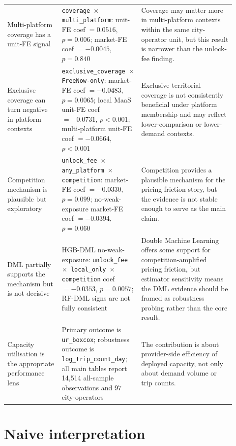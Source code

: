 \documentclass[11pt]{article}
\newcommand{\code}[1]{\texttt{\small #1}}
\begin{document}
\begin{landscape}
\begin{longtable}{L{0.22\linewidth} L{0.32\linewidth} L{0.38\linewidth}}
Multi-platform coverage has a unit-FE signal &
\code{coverage $\times$ multi\_platform}: unit-FE coef $=0.0516$, $p=0.006$; market-FE coef $=-0.0045$, $p=0.840$ &
Coverage may matter more in multi-platform contexts within the same city-operator unit, but this result is narrower than the unlock-fee finding. \\

Exclusive coverage can turn negative in platform contexts &
\code{exclusive\_coverage $\times$ FreeNow-only}: market-FE coef $=-0.0483$, $p=0.0065$; local MaaS unit-FE coef $=-0.0731$, $p<0.001$; multi-platform unit-FE coef $=-0.0664$, $p<0.001$ &
Exclusive territorial coverage is not consistently beneficial under platform membership and may reflect lower-comparison or lower-demand contexts. \\

Competition mechanism is plausible but exploratory &
\code{unlock\_fee $\times$ any\_platform $\times$ competition}: market-FE coef $=-0.0330$, $p=0.099$; no-weak-exposure market-FE coef $=-0.0394$, $p=0.060$ &
Competition provides a plausible mechanism for the pricing-friction story, but the evidence is not stable enough to serve as the main claim. \\

DML partially supports the mechanism but is not decisive &
HGB-DML no-weak-exposure: \code{unlock\_fee $\times$ local\_only $\times$ competition} coef $=-0.0353$, $p=0.0057$; RF-DML signs are not fully consistent &
Double Machine Learning offers some support for competition-amplified pricing friction, but estimator sensitivity means the DML evidence should be framed as robustness probing rather than the core result. \\

Capacity utilisation is the appropriate performance lens &
Primary outcome is \code{ur\_boxcox}; robustness outcome is \code{log\_trip\_count\_day}; all main tables report 14,514 all-sample observations and 97 city-operators &
The contribution is about provider-side efficiency of deployed capacity, not only about demand volume or trip counts. \\

\end{longtable}
\end{landscape}

\section*{Naive interpretation}
\end{document}

